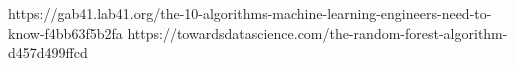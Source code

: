 \documentclass[journal]{IEEEtran}
\begin{document}
\begin{thebibliography}{1}
https://gab41.lab41.org/the-10-algorithms-machine-learning-engineers-need-to-know-f4bb63f5b2fa
https://towardsdatascience.com/the-random-forest-algorithm-d457d499ffcd
\end{thebibliography}
\end{document}
